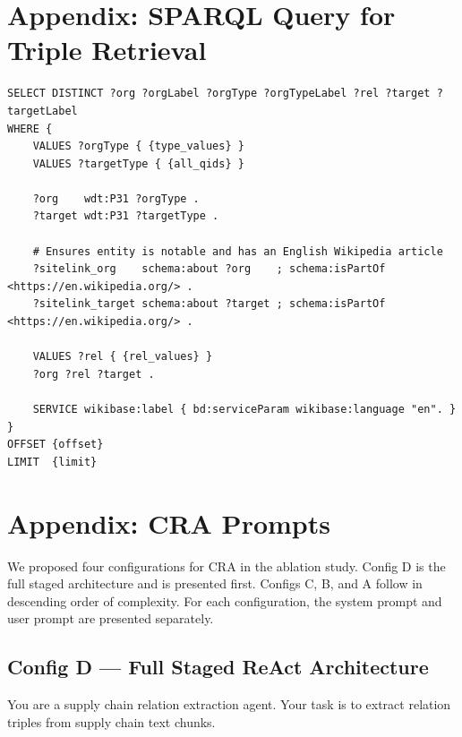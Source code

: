 \begin{appendices}
\begin{longtable}{l|p{5cm}|p{3cm}|l}
\end{longtable}
\endgroup


\chapter{Appendix: SPARQL Query for Triple Retrieval}
\label{app:sparql_query}

\begin{lstlisting}[style=sparqlstyle, caption={SPARQL query used to retrieve supply chain triples from Wikidata. \texttt{\{type\_values\}}, \texttt{\{all\_qids\}}, \texttt{\{rel\_values\}}, \texttt{\{offset\}}, and \texttt{\{limit\}} are Python format string placeholders substituted at runtime.}, label=lst:sparql]
SELECT DISTINCT ?org ?orgLabel ?orgType ?orgTypeLabel ?rel ?target ?targetLabel
WHERE {
    VALUES ?orgType { {type_values} }
    VALUES ?targetType { {all_qids} }

    ?org    wdt:P31 ?orgType .
    ?target wdt:P31 ?targetType .

    # Ensures entity is notable and has an English Wikipedia article
    ?sitelink_org    schema:about ?org    ; schema:isPartOf <https://en.wikipedia.org/> .
    ?sitelink_target schema:about ?target ; schema:isPartOf <https://en.wikipedia.org/> .

    VALUES ?rel { {rel_values} }
    ?org ?rel ?target .

    SERVICE wikibase:label { bd:serviceParam wikibase:language "en". }
}
OFFSET {offset}
LIMIT  {limit}
\end{lstlisting}


\chapter{Appendix: CRA Prompts}
\label{app:cra_prompts}

We proposed four configurations for CRA in the ablation study.
Config D is the full staged architecture and is presented first.
Configs C, B, and A follow in descending order of complexity.
For each configuration, the system prompt and user prompt are
presented separately.


\section*{Config D — Full Staged ReAct Architecture}
\begin{tcolorbox}[sysprompt, title=System Prompt]
You are a supply chain relation extraction agent. Your task is to
extract relation triples from supply chain text chunks.


\end{tcolorbox}
\end{appendices}

